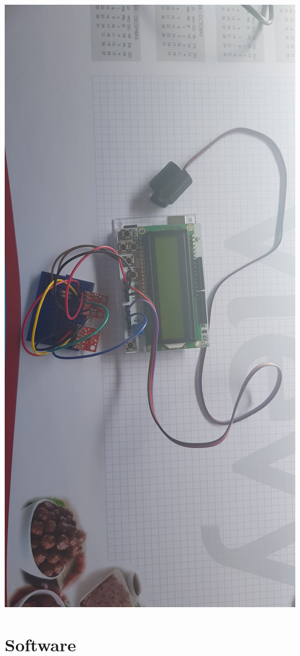 \documentclass[a4paper]{report}
\begin{document}
\includegraphics[width=\textwidth]{Fysieke_Voorstelling2}

\chapter{Software}
\end{document}
